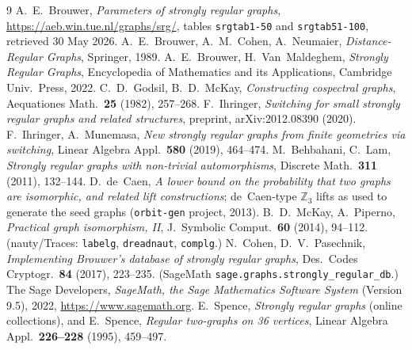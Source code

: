\documentclass[11pt]{article}
\theoremstyle{definition}
\begin{document}
\begin{thebibliography}{9}
 A.~E.~Brouwer, \emph{Parameters of strongly regular graphs},
  \url{https://aeb.win.tue.nl/graphs/srg/}, tables \texttt{srgtab1-50} and
  \texttt{srgtab51-100}, retrieved 30 May 2026.
 A.~E.~Brouwer, A.~M.~Cohen, A.~Neumaier, \emph{Distance-Regular Graphs},
  Springer, 1989.
 A.~E.~Brouwer, H.~Van~Maldeghem, \emph{Strongly Regular Graphs},
  Encyclopedia of Mathematics and its Applications, Cambridge Univ.\ Press, 2022.
 C.~D.~Godsil, B.~D.~McKay, \emph{Constructing cospectral graphs},
  Aequationes Math.\ \textbf{25} (1982), 257--268.
 F.~Ihringer, \emph{Switching for small strongly regular graphs and
  related structures}, preprint, arXiv:2012.08390 (2020).
 F.~Ihringer, A.~Munemasa, \emph{New strongly regular graphs
  from finite geometries via switching}, Linear Algebra Appl.\ \textbf{580} (2019),
  464--474.
 M.~Behbahani, C.~Lam, \emph{Strongly regular graphs with
  non-trivial automorphisms}, Discrete Math.\ \textbf{311} (2011), 132--144.
 D.~de~Caen, \emph{A lower bound on the probability that two graphs are
  isomorphic, and related lift constructions}; de~Caen-type $\mathbb{Z}_3$ lifts as used
  to generate the seed graphs (\texttt{orbit-gen} project, 2013).
 B.~D.~McKay, A.~Piperno, \emph{Practical graph isomorphism, II},
  J.\ Symbolic Comput.\ \textbf{60} (2014), 94--112. (nauty/Traces: \texttt{labelg},
  \texttt{dreadnaut}, \texttt{complg}.)
 N.~Cohen, D.~V.~Pasechnik, \emph{Implementing Brouwer's database
  of strongly regular graphs}, Des.\ Codes Cryptogr.\ \textbf{84} (2017), 223--235.
  (SageMath \texttt{sage.graphs.strongly\_regular\_db}.)
 The Sage Developers, \emph{SageMath, the Sage Mathematics Software
  System} (Version 9.5), 2022, \url{https://www.sagemath.org}.
 E.~Spence, \emph{Strongly regular graphs} (online collections), and
  E.~Spence, \emph{Regular two-graphs on 36 vertices}, Linear Algebra Appl.\ \textbf{226--228}
  (1995), 459--497.
\end{thebibliography}
\end{document}
